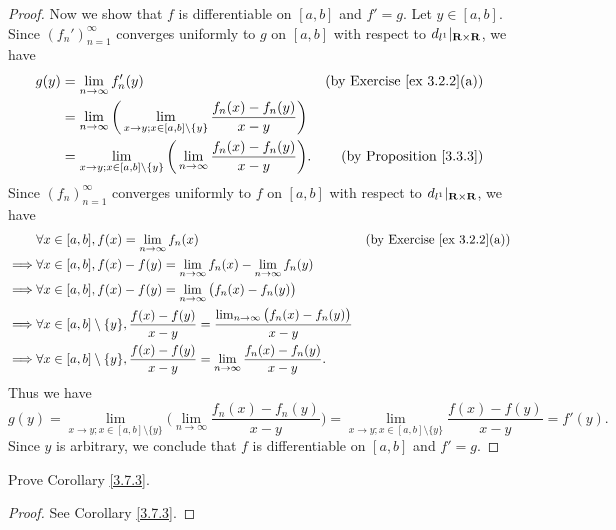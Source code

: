 \begin{proof}
    Now we show that \(f\) is differentiable on \([a, b]\) and \(f' = g\).
    Let \(y \in [a, b]\).
    Since \((f_n')_{n = 1}^\infty\) converges uniformly to \(g\) on \([a, b]\) with respect to \(d_{l^1}|_{\mathbf{R} \times \mathbf{R}}\), we have
    \begin{align*}
        g(y) & = \lim_{n \to \infty} f_n'(y)                                                                                  & \text{(by Exercise \ref{ex 3.2.2}(a))} \\
             & = \lim_{n \to \infty} \bigg(\lim_{x \to y ; x \in [a, b] \setminus \{y\}} \frac{f_n(x) - f_n(y)}{x - y}\bigg)                                           \\
             & = \lim_{x \to y ; x \in [a, b] \setminus \{y\}} \bigg(\lim_{n \to \infty} \frac{f_n(x) - f_n(y)}{x - y}\bigg). & \text{(by Proposition \ref{3.3.3})}
    \end{align*}
    Since \((f_n)_{n = 1}^\infty\) converges uniformly to \(f\) on \([a, b]\) with respect to \(d_{l^1}|_{\mathbf{R} \times \mathbf{R}}\), we have
    \begin{align*}
                 & \forall x \in [a, b], f(x) = \lim_{n \to \infty} f_n(x)                                                                       & \text{(by Exercise \ref{ex 3.2.2}(a))} \\
        \implies & \forall x \in [a, b], f(x) - f(y) = \lim_{n \to \infty} f_n(x) - \lim_{n \to \infty} f_n(y)                                                                            \\
        \implies & \forall x \in [a, b], f(x) - f(y) = \lim_{n \to \infty} \big(f_n(x) - f_n(y)\big)                                                                                      \\
        \implies & \forall x \in [a, b] \setminus \{y\}, \frac{f(x) - f(y)}{x - y} = \frac{\lim_{n \to \infty} \big(f_n(x) - f_n(y)\big)}{x - y}                                          \\
        \implies & \forall x \in [a, b] \setminus \{y\}, \frac{f(x) - f(y)}{x - y} = \lim_{n \to \infty} \frac{f_n(x) - f_n(y)}{x - y}.
    \end{align*}
    Thus we have
    \[
        g(y) = \lim_{x \to y ; x \in [a, b] \setminus \{y\}} \bigg(\lim_{n \to \infty} \frac{f_n(x) - f_n(y)}{x - y}\bigg) = \lim_{x \to y ; x \in [a, b] \setminus \{y\}} \frac{f(x) - f(y)}{x - y} = f'(y).
    \]
    Since \(y\) is arbitrary, we conclude that \(f\) is differentiable on \([a, b]\) and \(f' = g\).
\end{proof}

\begin{exercise}\label{ex 3.7.3}
    Prove Corollary \ref{3.7.3}.
\end{exercise}

\begin{proof}
    See Corollary \ref{3.7.3}.
\end{proof}